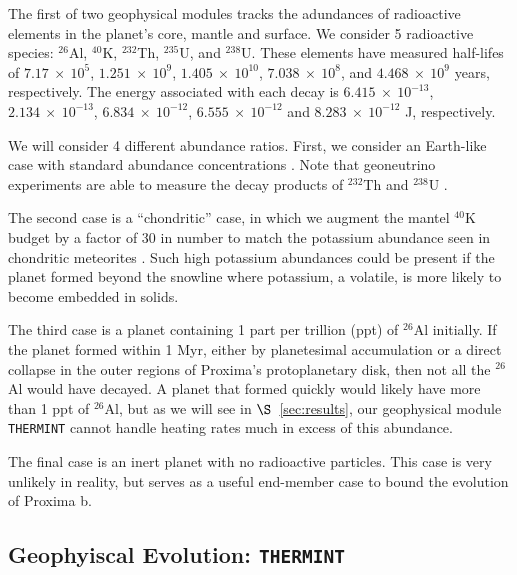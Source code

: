 \documentclass[preprint,12pt]{aastex}
\def\eg{{\it e.g.\ }}
\def\thermint{\texttt{\footnotesize{THERMINT}}\xspace}
\begin{document}
The first of two geophysical modules tracks the adundances of
radioactive elements in the planet's core, mantle and surface. We
consider 5 radioactive species: $^{26}$Al, $^{40}$K, $^{232}$Th,
$^{235}$U, and $^{238}$U. These elements have measured half-lifes of
$7.17~\times~10^5$, $1.251~\times~10^9$, $1.405~\times~10^{10}$,
$7.038~\times~10^8$, and $4.468~\times~10^9$ years, respectively. The
energy associated with each decay is $6.415~\times~10^{-13}$,
$2.134~\times~10^{-13}$, $6.834~\times~10^{-12}$,
$6.555~\times~10^{-12}$ and $8.283~\times~10^{-12}$ J, respectively.

We will consider 4 different abundance ratios. First, we consider an
Earth-like case with standard abundance concentrations
\citep[\eg][]{Korenaga03,Arevalo09,Huang13}. Note that geoneutrino
experiments are able to measure the decay products of $^{232}$Th and
$^{238}$U \citep{Raghavan98,Araki05,Dye10}.

The second case is a ``chondritic'' case, in which we augment the
mantel $^{40}$K budget by a factor of 30 in number to match the
potassium abundance seen in chondritic meteorites
\citep{AndersGrevesse89,Arevalo09}. Such high potassium abundances could be
present if the planet formed beyond the snowline where potassium, a
volatile, is more likely to become embedded in solids.

The third case is a planet containing 1 part per trillion (ppt) of
$^{26}$Al initially. If the planet formed within 1 Myr, either by
planetesimal accumulation or a direct collapse in the outer regions of
Proxima's protoplanetary disk, then not all the $^{26}$Al would have
decayed. A planet that formed quickly would likely have more than 1
ppt of $^{26}$Al, but as we will see in $\S$~\ref{sec:results}, our
geophysical module \thermint cannot handle heating rates much in
excess of this abundance.

The final case is an inert planet with no radioactive particles. This
case is very unlikely in reality, but serves as a useful end-member
case to bound the evolution of Proxima b.

\subsection{Geophyiscal Evolution: \thermint}
\label{sec:models:thermint}
\end{document}
